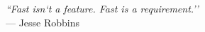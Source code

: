 \cleardoublepage
\thispagestyle{plain}

\vspace*{8cm}

\begin{flushright}
  \emph{``Fast isn`t a feature. Fast is a requirement.''} \\
  \vspace*{1.5cm}
  --- Jesse Robbins
\end{flushright}

